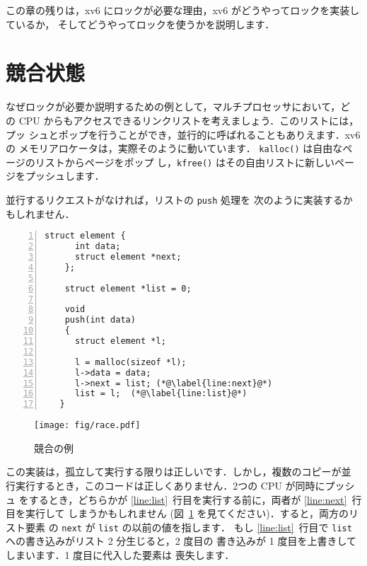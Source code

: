 この章の残りは，xv6 にロックが必要な理由，xv6 がどうやってロックを実装しているか，
そしてどうやってロックを使うかを説明します．

% 

\section{競合状態}

なぜロックが必要か説明するための例として，マルチプロセッサにおいて，ど
の CPU からもアクセスできるリンクリストを考えましょう．このリストには，プッ
シュとポップを行うことができ，並行的に呼ばれることもありえます．xv6 の
メモリアロケータは，実際そのように動いています．
\lstinline{kalloc()}  は自由なページのリストからページをポップ
し，\lstinline{kfree()} 
はその自由リストに新しいページをプッシュします．


並行するリクエストがなければ，リストの \lstinline{push} 処理を
次のように実装するかもしれません．
\begin{lstlisting}[numbers=left,firstnumber=1]
    struct element {
      int data;
      struct element *next;
    };
    
    struct element *list = 0;
    
    void
    push(int data)
    {
      struct element *l;
   
      l = malloc(sizeof *l);
      l->data = data;
      l->next = list; (*@\label{line:next}@*)
      list = l;  (*@\label{line:list}@*)
   }
\end{lstlisting}

\begin{figure}[t]
\center
\texttt{[image: fig/race.pdf]}
\caption{競合の例}
\label{fig:race}
\end{figure}
%
この実装は，孤立して実行する限りは正しいです．しかし，複数のコピーが並
行実行するとき，このコードは正しくありません．2つの CPU が同時にプッシュ
をするとき，どちらかが \ref{line:list}~行目を実行する前に，両者が \ref{line:next}~行目を実行して
しまうかもしれません (図~\ref{fig:race} を見てください)．すると，両方のリスト要素
の \lstinline{next} が \lstinline{list} の以前の値を指します．
もし \ref{line:list}~行目で \lstinline{list} への書き込みがリスト 2 分生じると，2 度目の
書き込みが 1 度目を上書きしてしまいます．1 度目に代入した要素は
喪失します．

